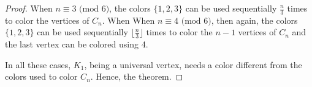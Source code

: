 \documentclass[10pt,a4paper]{amsart}
\begin{document}
\begin{proof}
When $n \equiv 3 \text{ (mod 6)}$, the colors $\{1,2,3\}$ can be used sequentially $\frac{n}{3}$ times to color the vertices of $C_n$. When When $n \equiv 4 \text{ (mod 6)}$, then again, the colors $\{1,2,3\}$ can be used sequentially $\lfloor\frac{n}{3}\rfloor$ times to color the $n-1$ vertices of $C_n$ and the last vertex can be colored using 4.\par

In all these cases, $K_1$, being a universal vertex, needs a color different from the colors used to color $C_n$. Hence, the theorem.
\end{proof}
\end{document}
